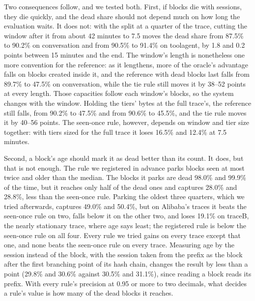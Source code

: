 Two consequences follow, and we tested both. First, if blocks die with sessions, they die quickly, and the
dead share should not depend much on how long the evaluation waits. It does not: with the split at a quarter
of the trace, cutting the window after it from about 42 minutes to 7.5 moves the dead share from 87.5\% to
90.2\% on conversation and from 90.5\% to 91.4\% on toolagent, by 1.8 and 0.2 points between 15 minutes and
the end. The window's length is nonetheless one more convention for the reference: as it lengthens, more
of the oracle's advantage falls on blocks created inside it, and the reference with dead blocks last falls
from 89.7\% to 47.5\% on conversation, while the tie rule still moves it by 38--52 points at every length.
Those capacities follow each window's blocks, so the system changes with the window. Holding the tiers'
bytes at the full trace's, the reference still falls, from 90.2\% to 47.5\% and from 90.6\% to 45.5\%,
and the tie rule moves it by 40--56 points. The seen-once rule, however, depends on window and tier size
together: with tiers sized for the full trace it loses 16.5\% and 12.4\% at 7.5 minutes.

Second, a block's age should mark it as dead better than its count. It does, but that is not enough. The
rule we registered in advance parks blocks seen at most twice and older than the median. The blocks it parks
are dead 98.0\% and 99.9\% of the time, but it reaches only half of the dead ones and captures 28.0\% and
28.8\%, less than the seen-once rule. Parking the oldest three quarters, which we tried afterwards,
captures 49.0\% and 50.4\%, but on Alibaba's traces it beats the seen-once rule on two, falls below it on
the other two, and loses 19.1\% on traceB, the nearly stationary trace, where age says least; the
registered rule is below the seen-once rule on all four. Every rule we tried gains on every trace except
that one, and none beats the seen-once rule on every trace. Measuring age by the session instead of the
block, with the session taken from the prefix as the block after the first branching point of its hash
chain, changes the result by less than a point (29.8\% and 30.6\% against 30.5\% and 31.1\%), since reading
a block reads its prefix. With every rule's precision at 0.95 or more to two decimals, what decides a rule's
value is how many of the dead blocks it reaches.
